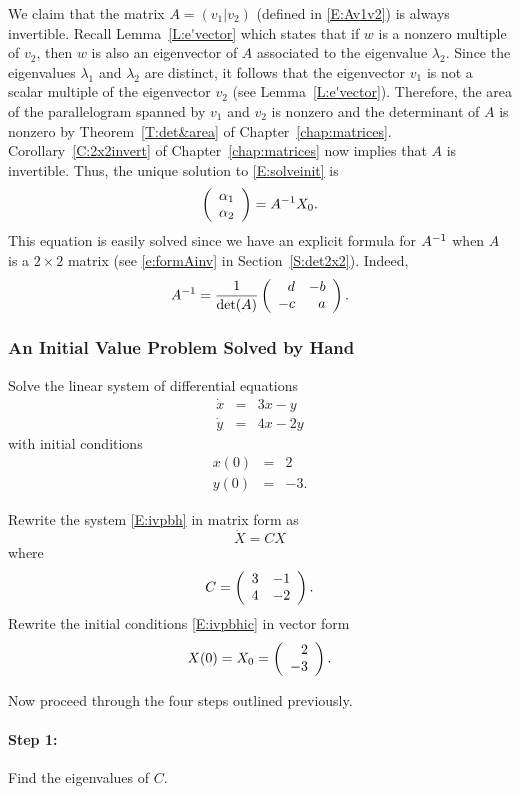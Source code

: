 \documentclass{ximera}
\begin{document}
We claim that the matrix $A=(v_1|v_2)$ (defined in \eqref{E:Av1v2}) is always
invertible.  Recall Lemma~\ref{L:e'vector} which states that if $w$ is a 
nonzero multiple of $v_2$, then $w$ is also an eigenvector of $A$ associated to the eigenvalue $\lambda_2$.  Since the eigenvalues $\lambda_1$
and $\lambda_2$ are distinct, it follows that the eigenvector $v_1$ is not a
scalar multiple of the eigenvector $v_2$ (see Lemma~\ref{L:e'vector}).  
Therefore, the area of the
parallelogram spanned by $v_1$ and $v_2$ is nonzero and the determinant of
$A$ is nonzero by Theorem~\ref{T:det&area} of Chapter~\ref{chap:matrices}.   
Corollary~\ref{C:2x2invert} of Chapter~\ref{chap:matrices} now implies that 
$A$ is invertible.  Thus, the unique solution to \eqref{E:solveinit} is
\[
\left(\begin{array}{r} \alpha_1 \\ \alpha_2\end{array}\right) = A^{-1} X_0.
\]
This equation is easily solved since we have an explicit formula for
$A^{-1}$ when $A$ is a $2\times 2$ matrix (see \eqref{e:formAinv} in
Section~\ref{S:det2x2}).  Indeed,
\[
A^{-1} = \frac{1}{\det(A)}\left(\begin{array}{rr} d & -b\\ -c &a\end{array}\right).
\]

\subsubsection*{An Initial Value Problem Solved by Hand}

Solve the linear system of differential equations
\begin{equation}  \label{E:ivpbh}
\begin{array}{rcl}
\dot{x} & = & 3x-y \\
\dot{y} & = & 4x-2y \end{array}
\end{equation}
with initial conditions
\begin{equation}  \label{E:ivpbhic}
\begin{array}{rcc}
 x(0) & = & 2 \\
 y(0) & = & -3.
\end{array}
\end{equation}

Rewrite the system \eqref{E:ivpbh} in matrix form as
\[
\dot{X} = CX
\]
where
\[
C = \left(\begin{array}{rr} 3 & -1\\ 4 &-2\end{array}\right).
\]
Rewrite the initial conditions \eqref{E:ivpbhic} in vector form
\[
X(0) = X_0 = \left(\begin{array}{r} 2 \\ -3\end{array}\right).
\]

Now proceed through the four steps outlined previously.

\paragraph{Step 1:}  Find the eigenvalues of $C$.
\end{document}
